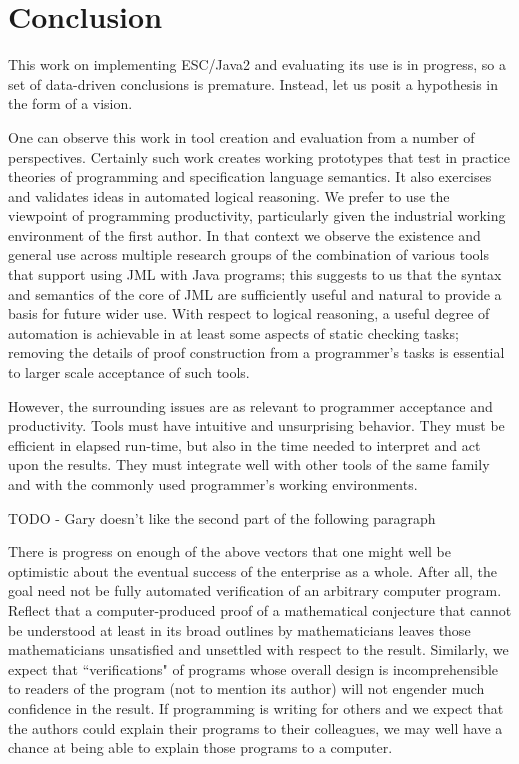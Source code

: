 \documentclass{sig-alternate}
\begin{document}
\section{Conclusion}

This work on implementing ESC/Java2 and evaluating its use is in progress, so a
set of data-driven conclusions is premature.  Instead, let us posit a hypothesis in the form of a vision.

One can observe this work in tool creation and evaluation from a number 
of perspectives.  Certainly such work creates working prototypes that test in practice
theories of programming and specification language semantics.
It also exercises and validates ideas in automated logical reasoning.
We prefer to use the viewpoint of programming productivity,
particularly given the industrial working environment of the first author.  In that
context we observe 
the existence and general use across multiple research groups of the combination of various tools that support
using JML with Java programs; this suggests to us
 that the syntax and semantics of the core of JML are 
sufficiently useful and natural to provide a basis for future wider use.
With respect to logical reasoning, a useful degree of automation is achievable in 
at least some aspects of
static checking tasks; removing the details of proof construction from a programmer's
tasks is essential to larger scale acceptance of such tools.

However, the surrounding issues are as relevant to programmer acceptance and
productivity.  Tools must have intuitive and unsurprising behavior. They must be efficient
in elapsed run-time, but also in the time needed to interpret and act upon the results.
They must integrate well with other tools of the same family and with the commonly used
programmer's working environments. 

TODO - Gary doesn't like the second part of the following paragraph

There is progress on enough of the above vectors that one might well be optimistic about the
eventual success of the enterprise as a whole.  After all, the goal need not be fully
automated verification of an
arbitrary computer program.  Reflect that a computer-produced proof
of a mathematical conjecture that cannot be understood at least in its broad outlines by
mathematicians leaves those mathematicians unsatisfied and unsettled with respect to the
result.  Similarly, we expect that ``verifications" of programs whose overall
design is incomprehensible
to readers of the program (not to mention its author) will not engender much confidence
in the result.  If programming is writing for others and we expect that the authors could 
explain their programs to their colleagues, we may well have a chance at being able to explain those programs to a computer.
\end{document}

